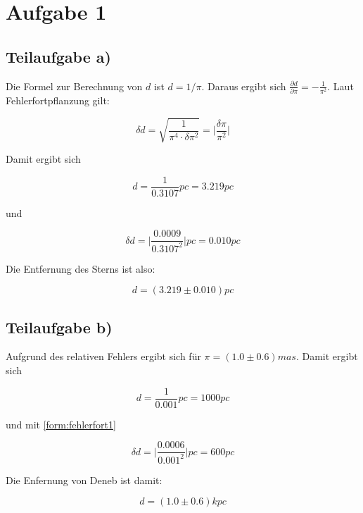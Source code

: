 \documentclass[titlepage]{scrartcl}
\begin{document}
\section{Aufgabe 1}
\subsection{Teilaufgabe a)}

Die Formel zur Berechnung von $ d $ ist $ d = 1/ \pi $. Daraus ergibt sich $ \frac{\partial d}{\partial \pi} = - \frac{1}{\pi^2} $. Laut Fehlerfortpflanzung gilt:

\begin{equation}
\delta d = \sqrt{\frac{1}{\pi^4 \cdot \delta \pi^2}} = \vert \frac{\delta \pi}{\pi^2} \vert
\label{form:fehlerfort1}
\end{equation}

Damit ergibt sich

\begin{equation}
d = \frac{1}{0.3107} pc = 3.219 pc
\end{equation}

und

\begin{equation}
\delta d = \vert \frac{0.0009}{0.3107^2} \vert pc = 0.010 pc
\end{equation}

Die Entfernung des Sterns ist also:

\begin{equation}
d = (3.219 \pm 0.010 ) pc
\end{equation}

\subsection{Teilaufgabe b)}
Aufgrund des relativen Fehlers ergibt sich für $ \pi = (1.0 \pm 0.6) mas $. Damit ergibt sich

\begin{equation}
d = \frac{1}{0.001} pc = 1000 pc
\end{equation}

und mit \eqref{form:fehlerfort1}

\begin{equation}
\delta d = \vert \frac{0.0006}{0.001^2} \vert pc = 600 pc
\end{equation}

Die Enfernung von Deneb ist damit:

\begin{equation}
d = (1.0 \pm 0.6 ) kpc
\end{equation}
\end{document}
